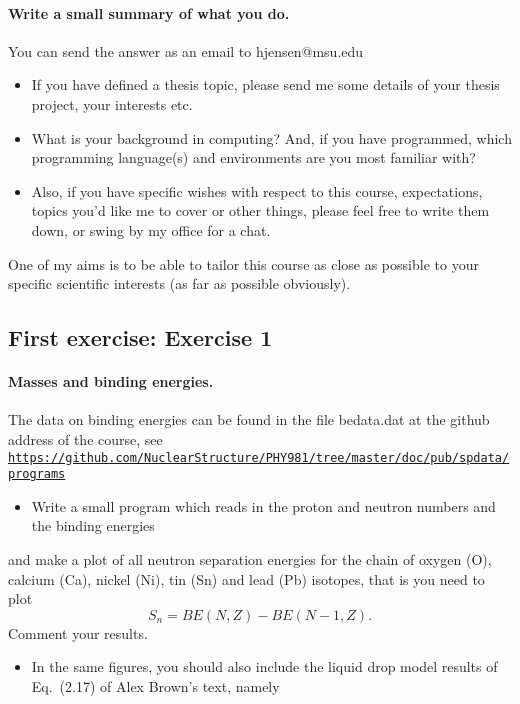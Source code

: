 \documentclass[%
twoside,                 %
final,                   %
10pt]{article}
\begin{document}
\paragraph{Write a small summary of what you do.}
You can send the answer as an email to hjensen@msu.edu
\begin{itemize}
\item If you have defined a thesis topic, please send me some details of your thesis project, your interests etc.

\item What is your background in computing? And, if you have programmed, which programming language(s) and environments  are you  most familiar with?  

\item Also, if you have specific wishes with respect to this course, expectations, topics you'd like me to cover or other things, please feel free to write them down, or swing by my office for a chat. 
\end{itemize}

\noindent
One of my aims is to be able to tailor this course as close as possible to your specific scientific interests (as far as possible obviously).



\subsection{First exercise: Exercise 1}

\paragraph{Masses and binding energies.}
The data on binding energies can be found in the file bedata.dat at the github address of the course, see
\href{{https://github.com/NuclearStructure/PHY981/tree/master/doc/pub/spdata/programs}}{\nolinkurl{https://github.com/NuclearStructure/PHY981/tree/master/doc/pub/spdata/programs}}

\begin{itemize}
  \item Write a small program which reads in the proton and neutron numbers and the binding energies 
\end{itemize}

\noindent
and make a plot of all neutron separation energies for the chain of oxygen (O), calcium (Ca), nickel (Ni), tin (Sn) and lead (Pb) isotopes, that is you need to plot
\[
S_n= BE(N,Z)-BE(N-1,Z).
\]
Comment your results. 
\begin{itemize}
 \item In the same figures, you should also include the liquid drop model results of Eq.~(2.17) of Alex Brown's text, namely
\end{itemize}
\end{document}
